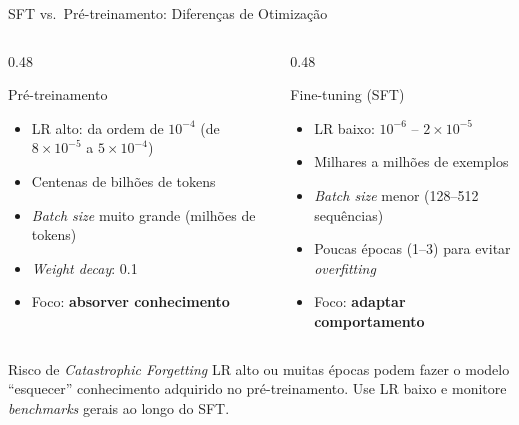 \documentclass[aspectratio=169, xcolor=dvipsnames]{beamer}
\begin{document}
  \begin{frame}{SFT vs.\ Pré-treinamento: Diferenças de Otimização}
    \begin{columns}[T]
      \begin{column}{0.48\textwidth}
        \begin{block}{Pré-treinamento}
          \begin{itemize}
            \item LR alto: da ordem de $10^{-4}$ (de $8\times10^{-5}$ a $5\times10^{-4}$)
            \item Centenas de bilhões de tokens
            \item \textit{Batch size} muito grande (milhões de tokens)
            \item \textit{Weight decay}: 0.1
            \item Foco: \textbf{absorver conhecimento}
          \end{itemize}
        \end{block}
      \end{column}
      \begin{column}{0.48\textwidth}
        \begin{block}{Fine-tuning (SFT)}
          \begin{itemize}
            \item LR baixo: $10^{-6}$ -- $2\times10^{-5}$
            \item Milhares a milhões de exemplos
            \item \textit{Batch size} menor (128--512 sequências)
            \item Poucas épocas (1--3) para evitar \textit{overfitting}
            \item Foco: \textbf{adaptar comportamento}
          \end{itemize}
        \end{block}
      \end{column}
    \end{columns}

    \vspace{0.2em}
    \begin{alertblock}{Risco de \textit{Catastrophic Forgetting}}
      \small LR alto ou muitas épocas podem fazer o modelo ``esquecer'' conhecimento
      adquirido no pré-treinamento. Use LR baixo e monitore \textit{benchmarks}
      gerais ao longo do SFT.
    \end{alertblock}
  \end{frame}
\end{document}
